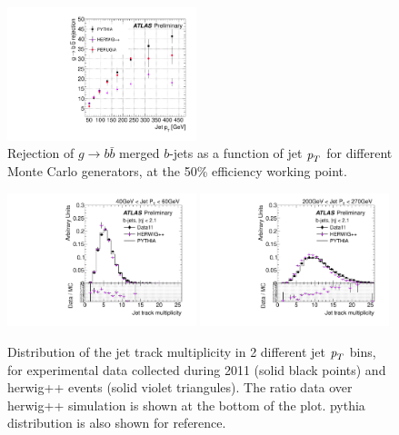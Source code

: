 \begin{figure}[tp]
\centering
\includegraphics[width=0.49\textwidth]{gbbRejection_vs_PT_3MonteCarlos_50Eff.pdf}
\caption{Rejection of $g\rightarrow b \bar{b}$ merged $b$-jets as a function of jet ${\emph{p}_{T}}$ for different Monte Carlo generators, at the 50\% efficiency working point.}
\label{fig:performanceotherMC}
\end{figure}

\begin{figure}[tp]
\centering
\includegraphics[width=0.49\textwidth]{FIGS/systematics/DataVarNtrkPT040.pdf}
\includegraphics[width=0.49\textwidth]{FIGS/systematics/DataVarNtrkPT200.pdf}
\caption{Distribution of the jet track multiplicity in 2 different jet ${\emph{p}_{T}}$ bins, for experimental data  collected during 2011 (solid black points) and {\sc herwig}++ events (solid violet triangules). The ratio data over {\sc herwig}++ simulation is shown at the bottom of the plot. {\sc pythia} distribution is also shown for reference.}
\label{fig:herwigdatamc}
\end{figure}



